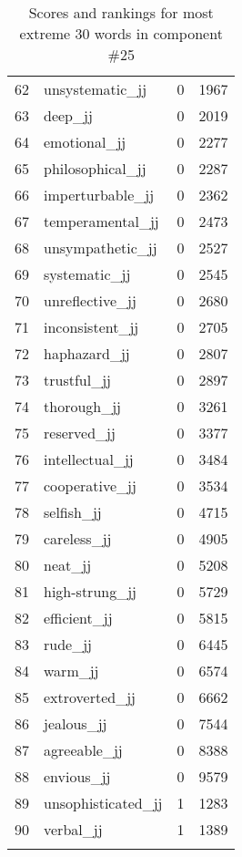 \begin{longtable}[!htbp]{| rlr@{.}l |}
    62 & unsystematic\_jj & 0 & 1967 \\
    63 & deep\_jj & 0 & 2019 \\
    64 & emotional\_jj & 0 & 2277 \\
    65 & philosophical\_jj & 0 & 2287 \\
    66 & imperturbable\_jj & 0 & 2362 \\
    67 & temperamental\_jj & 0 & 2473 \\
    68 & unsympathetic\_jj & 0 & 2527 \\
    69 & systematic\_jj & 0 & 2545 \\
    70 & unreflective\_jj & 0 & 2680 \\
    71 & inconsistent\_jj & 0 & 2705 \\
    72 & haphazard\_jj & 0 & 2807 \\
    73 & trustful\_jj & 0 & 2897 \\
    74 & thorough\_jj & 0 & 3261 \\
    75 & reserved\_jj & 0 & 3377 \\
    76 & intellectual\_jj & 0 & 3484 \\
    77 & cooperative\_jj & 0 & 3534 \\
    78 & selfish\_jj & 0 & 4715 \\
    79 & careless\_jj & 0 & 4905 \\
    80 & neat\_jj & 0 & 5208 \\
    81 & high-strung\_jj & 0 & 5729 \\
    82 & efficient\_jj & 0 & 5815 \\
    83 & rude\_jj & 0 & 6445 \\
    84 & warm\_jj & 0 & 6574 \\
    85 & extroverted\_jj & 0 & 6662 \\
    86 & jealous\_jj & 0 & 7544 \\
    87 & agreeable\_jj & 0 & 8388 \\
    88 & envious\_jj & 0 & 9579 \\
    89 & unsophisticated\_jj & 1 & 1283 \\
    90 & verbal\_jj & 1 & 1389 \\
    \hline
    \caption{Scores and rankings for most extreme 30 words in component \#25} \\
\end{longtable}
